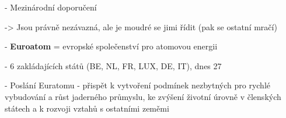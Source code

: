 \noindent\noindent - 	Mezinárodní doporučení

->	Jsou právně nezávazná, ale je moudré se jimi řídit (pak se ostatní mračí)


\noindent- \textbf{Euroatom} = evropské společenství pro atomovou energii

\noindent - 	6 zakládajících států (BE, NL, FR, LUX, DE, IT), dnes 27


\noindent - 	Poslání Euratomu - přispět k vytvoření podmínek nezbytných pro rychlé vybudování a růst jaderného průmyslu, ke zvýšení životní úrovně v členských státech a k rozvoji vztahů s ostatními zeměmi
